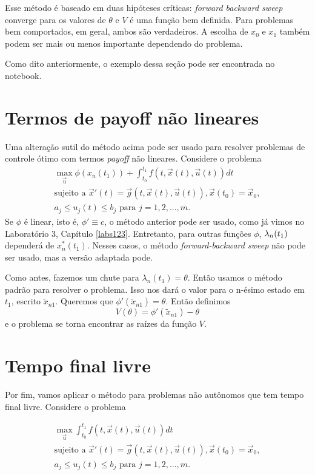 Esse método é baseado em duas hipóteses críticas: \textit{forward
backward sweep} converge para os valores de $\theta$ e $V$ é uma função bem
definida. Para problemas bem comportados, em geral, ambos são verdadeiros. A
escolha de $x_0$ e $x_1$ também podem ser mais ou menos importante dependendo
do problema. 

Como dito anteriormente, o exemplo dessa seção pode ser encontrada no
notebook. 

\section{Termos de payoff não lineares}

Uma alteração sutil do método acima pode ser usado para resolver problemas de
controle ótimo com termos \textit{payoff} não lineares. Considere o problema 
\begin{gather*}
    \max_{\vec{u}} \phi(x_n(t_1)) + \int_{t_0}^{t_1} f(t, \vec{x}(t), \vec{u}(t)) dt \\ 
    \text{sujeito a   }\vec{x}'(t) = \vec{g}(t, \vec{x}(t), \vec{u}(t)),  
    \vec{x}(t_0) = \vec{x}_0,  \\
    a_j \le u_j(t) \le b_j \text{ para }j = 1,2,...,m.
\end{gather*}
Se $\phi$ é linear, isto é, $\phi ' \equiv c$, o método anterior pode ser
usado, como já vimos no Laboratório 3, Capítulo \ref{labs123}. Entretanto, para outras funções $\phi$, $\lambda_n(t_1)$ dependerá de
$x_n^*(t_1)$. Nesses casos, o método \textit{forward-backward sweep} não pode
ser usado, mas a versão adaptada pode.  

Como antes, fazemos um chute para $\lambda_n(t_1) = \theta$. Então usamos o
método padrão para resolver o problema. Isso nos dará o valor para o n-ésimo
estado em $t_1$, escrito $\tilde{x}_{n1}$. Queremos que $\phi
'(\tilde{x}_{n1}) = \theta$. Então definimos 
$$
V(\theta) = \phi '(\tilde{x}_{n1}) - \theta
$$
e o problema se torna encontrar as raízes da função $V$. 

\section{Tempo final livre}

Por fim, vamos aplicar o método para problemas não autônomos que tem tempo
final livre. Considere o problema 

\begin{gather*}
    \max_{\vec{u}} \int_{t_0}^{t_1} f(t, \vec{x}(t), \vec{u}(t)) dt \\ 
    \text{sujeito a }\vec{x}'(t) = \vec{g}(t, \vec{x}(t), \vec{u}(t)) ,  
    \vec{x}(t_0) = \vec{x}_0, \\
    a_j \le u_j(t) \le b_j \text{ para }j = 1,2,...,m.
\end{gather*}

